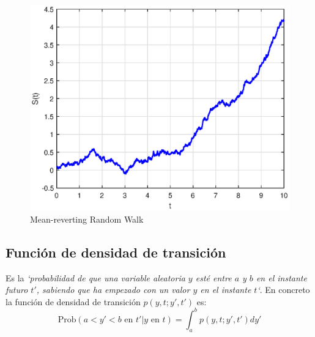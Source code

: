 \begin{itemize}
    \begin{figure}[H]
        \centering
        \includegraphics[width=0.65\linewidth]{Imagenes/3_Aleatoriedad/MeanRevertingWalk.eps}
        \caption{Mean-reverting Random Walk}
    \end{figure}
\end{itemize}



\subsection{Función de densidad de transición}
Es la \textit{`probabilidad de que una variable aleatoria $y$ esté entre $a$ y $b$ en el instante futuro $t'$, sabiendo que ha empezado con un valor $y$ en el instante $t$`}. En concreto la función de densidad de transición $p(y, t; y', t')$ es:
\[
    \boxed{\text{Prob}(a<y'<b\text{ en }t' | y\text{ en }t) = \int_a^b p(y, t; y', t') dy'}
\]

